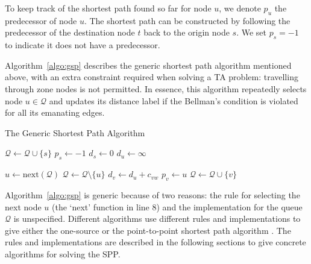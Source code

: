 To keep track of the shortest path found so far for node $u$,
we denote $p_u$ the predecessor of node $u$.
The shortest path can be constructed by following the predecessor of the destination node $t$ back to the origin node $s$.
We set $p_s = -1$ to indicate it does not have a predecessor.

Algorithm~\ref{algo:gsp} \citep{Klunder} describes the generic shortest path algorithm mentioned above,
with an extra constraint required when solving a TA problem: travelling through zone nodes is not permitted.
In essence, this algorithm repeatedly selects node $u\in\mathcal{Q}$ and 
updates its distance label if the Bellman's condition is violated for all its emanating edges.

\begin{algorithm}[H]
    \caption{The Generic Shortest Path Algorithm}
    \label{algo:gsp}
    \begin{algorithmic}[1]
        \State $\mathcal{Q} \gets \mathcal{Q} \cup \{s\}$ 
        \State $p_s \gets -1$ 
        \State $d_s \gets 0$
         
        \State $d_u \gets \infty$
    \EndFor

    \State $ u \gets \text{next}(\mathcal{Q}) $ 
    \State $ \mathcal{Q} \gets \mathcal{Q} \setminus \{u\} $
     
    \State $d_v \gets d_u + c_{vw}$
    \State $p_v \gets u$
    \State $\mathcal{Q} \gets \mathcal{Q} \cup \{v\}$ 
\EndIf
                    \EndIf
                \EndFor
            \EndIf
        \EndWhile
    \EndProcedure
\end{algorithmic}
\end{algorithm}

Algorithm~\ref{algo:gsp} is generic because of two reasons:
the rule for selecting the next node $u$ (the `next' function in line 8) and
the implementation for the queue $\mathcal{Q}$ is unspecified.
Different algorithms use different rules and implementations to give 
either the one-source or the point-to-point shortest path algorithm \citep{mplomer}.
The rules and implementations are described in the following sections to give concrete algorithms for solving the SPP.

